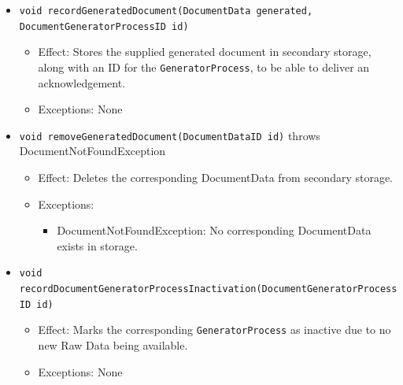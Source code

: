 \documentclass[a4paper,10pt]{article}
\begin{document}
\begin{itemize}
\begin{itemize}
		\item \texttt{void recordGeneratedDocument(DocumentData generated, DocumentGeneratorProcessID id)}
		\begin{itemize}
			\item Effect: Stores the supplied generated document in secondary storage, along with an ID for the \texttt{GeneratorProcess}, to be able to deliver an acknowledgement.
			\item Exceptions: None
		\end{itemize}
		
		\item \texttt{void removeGeneratedDocument(DocumentDataID id)} throws DocumentNotFoundException
		\begin{itemize}
			\item Effect: Deletes the corresponding DocumentData from secondary storage.
			\item Exceptions:
			\begin{itemize}
				\item DocumentNotFoundException: No corresponding DocumentData exists in storage.
			\end{itemize}
		\end{itemize}
		
		\item \texttt{void recordDocumentGeneratorProcessInactivation(DocumentGeneratorProcessID id)}
		\begin{itemize}
			\item Effect: Marks the corresponding \texttt{GeneratorProcess} as inactive due to no new Raw Data being available.
			\item Exceptions: None
		\end{itemize}
	\end{itemize}
\end{itemize}
\end{document}
